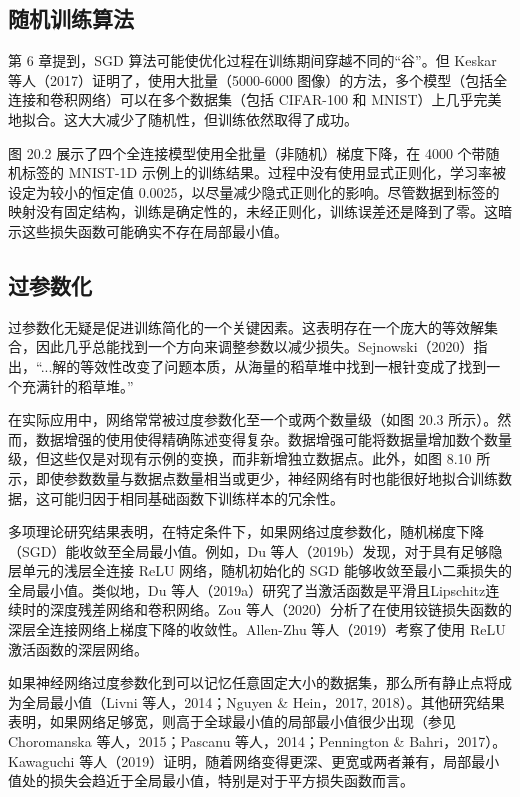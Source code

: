 \subsection{随机训练算法}
第 6 章提到，SGD 算法可能使优化过程在训练期间穿越不同的“谷”。但 Keskar 等人（2017）证明了，使用大批量（5000-6000 图像）的方法，多个模型（包括全连接和卷积网络）可以在多个数据集（包括 CIFAR-100 和 MNIST）上几乎完美地拟合。这大大减少了随机性，但训练依然取得了成功。

图 20.2 展示了四个全连接模型使用全批量（非随机）梯度下降，在 4000 个带随机标签的 MNIST-1D 示例上的训练结果。过程中没有使用显式正则化，学习率被设定为较小的恒定值 0.0025，以尽量减少隐式正则化的影响。尽管数据到标签的映射没有固定结构，训练是确定性的，未经正则化，训练误差还是降到了零。这暗示这些损失函数可能确实不存在局部最小值。

\subsection{过参数化}
过参数化无疑是促进训练简化的一个关键因素。这表明存在一个庞大的等效解集合，因此几乎总能找到一个方向来调整参数以减少损失。Sejnowski（2020）指出，“...解的等效性改变了问题本质，从海量的稻草堆中找到一根针变成了找到一个充满针的稻草堆。”

在实际应用中，网络常常被过度参数化至一个或两个数量级（如图 20.3 所示）。然而，数据增强的使用使得精确陈述变得复杂。数据增强可能将数据量增加数个数量级，但这些仅是对现有示例的变换，而非新增独立数据点。此外，如图 8.10 所示，即使参数数量与数据点数量相当或更少，神经网络有时也能很好地拟合训练数据，这可能归因于相同基础函数下训练样本的冗余性。

多项理论研究结果表明，在特定条件下，如果网络过度参数化，随机梯度下降（SGD）能收敛至全局最小值。例如，Du 等人（2019b）发现，对于具有足够隐层单元的浅层全连接 ReLU 网络，随机初始化的 SGD 能够收敛至最小二乘损失的全局最小值。类似地，Du 等人（2019a）研究了当激活函数是平滑且Lipschitz连续时的深度残差网络和卷积网络。Zou 等人（2020）分析了在使用铰链损失函数的深层全连接网络上梯度下降的收敛性。Allen-Zhu 等人（2019）考察了使用 ReLU 激活函数的深层网络。

如果神经网络过度参数化到可以记忆任意固定大小的数据集，那么所有静止点将成为全局最小值（Livni 等人，2014；Nguyen \& Hein，2017, 2018）。其他研究结果表明，如果网络足够宽，则高于全球最小值的局部最小值很少出现（参见 Choromanska 等人，2015；Pascanu 等人，2014；Pennington \& Bahri，2017）。Kawaguchi 等人（2019）证明，随着网络变得更深、更宽或两者兼有，局部最小值处的损失会趋近于全局最小值，特别是对于平方损失函数而言。

